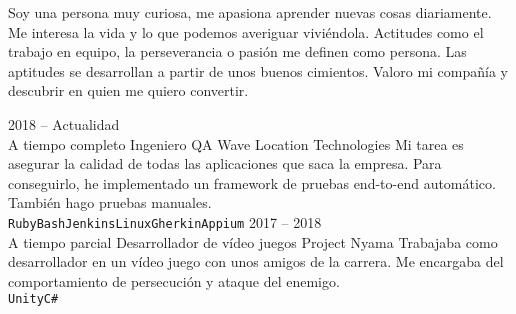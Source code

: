 \documentclass[9pt]{developercv} %
\begin{document}
\vspace{0.5cm}



\begin{minipage}[t]{0.4\textwidth} %
	\vspace{-\baselineskip} %
	Soy una persona muy curiosa, me apasiona aprender nuevas cosas diariamente.
	Me interesa la vida y lo que podemos averiguar viviéndola.
	Actitudes como el trabajo en equipo, la perseverancia o pasión me definen como persona.
	Las aptitudes se desarrollan a partir de unos buenos cimientos.
	Valoro mi compañía y descubrir en quien me quiero convertir.\\
	
\end{minipage}
\hfill %
\begin{minipage}[t]{0.5\textwidth} %
	\vspace{-\baselineskip} %
	\begin{barchart}{5.5}
	\end{barchart}
\end{minipage}



\begin{entrylist}
	\entry
		{2018 -- Actualidad\\\footnotesize{A tiempo completo}}
		{Ingeniero QA}
		{Wave Location Technologies}
		{Mi tarea es asegurar la calidad de todas las aplicaciones que saca la empresa.
		Para conseguirlo, he implementado un framework de pruebas end-to-end automático.
		También hago pruebas manuales.\\ \texttt{Ruby}\slashsep\texttt{Bash}\slashsep\texttt{Jenkins}\slashsep\texttt{Linux}\slashsep\texttt{Gherkin}\slashsep\texttt{Appium}}
	\entry
		{2017 -- 2018\\\footnotesize{A tiempo parcial}}
		{Desarrollador de vídeo juegos}
		{Project Nyama}
		{Trabajaba como desarrollador en un vídeo juego con unos amigos de la carrera.
		Me encargaba del comportamiento de persecución y ataque del enemigo.\\ \texttt{Unity}\slashsep\texttt{C\#}}
\end{entrylist}
\end{document}
